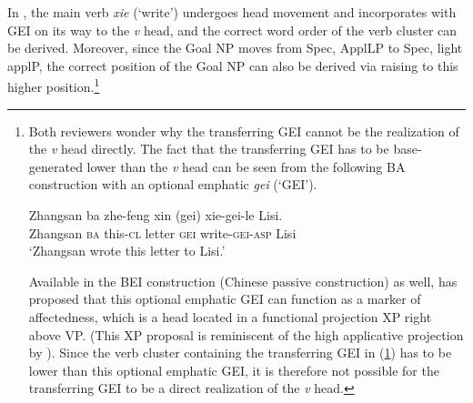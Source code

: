 \documentclass[output=paper,colorlinks,citecolor=brown]{langscibook}
\begin{document}
In , the main verb \textit{xie} (`write') undergoes head movement and incorporates with GEI on its way to the \textit{v} head, and the correct word order of the verb cluster can be derived. Moreover, since the Goal NP moves from Spec, ApplLP to Spec, light applP, the correct position of the Goal NP can also be derived via raising to this higher position.\footnote{Both reviewers wonder why the transferring GEI cannot be the realization of the \textit{v} head directly. The fact that the transferring GEI has to be base-generated lower than the \textit{v} head can be seen from the following BA construction with an optional emphatic \textit{gei} (`GEI').

\ea
\label{kuoii}
\gll Zhangsan ba zhe-feng	xin (gei)	xie-gei-le 		Lisi.\\
Zhangsan \textsc{ba} this-\textsc{cl} letter	\textsc{gei}	write-\textsc{gei}-\textsc{asp}	Lisi
\\
\glt `Zhangsan wrote this letter to Lisi.'
\z

Available in the BEI construction (Chinese passive construction) as well, \citet{Tang2001} has proposed that this optional emphatic GEI can function as a marker of affectedness, which is a head located in a functional projection XP right above VP. (This XP proposal is reminiscent of the high applicative projection by \citet{Pylkkanen2002, Pylkkanen2008}). Since the verb cluster containing the transferring GEI in (\ref{kuoii}) has to be lower than this optional emphatic GEI, it is therefore not possible for the transferring GEI to be a direct realization of the \textit{v} head.}


\end{document}
